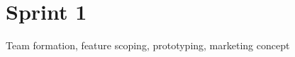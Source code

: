\documentclass{scrreprt}
\begin{document}
%
%

\section{Sprint 1}
Team formation, feature scoping, prototyping, marketing concept
\end{document}
